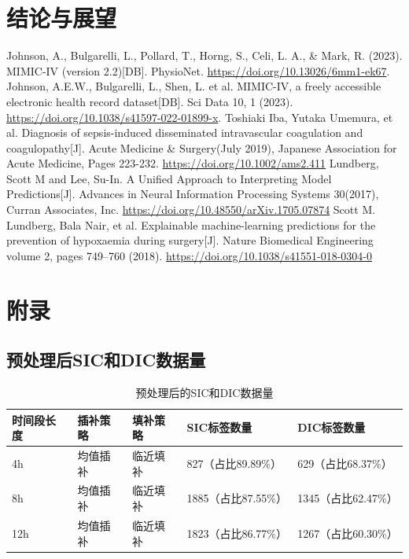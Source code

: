 \documentclass[12pt, a4paper, oneside]{ctexart}
\numberwithin{equation}{section}  %
\begin{document}
\section{结论与展望}
\clearpage
\begin{thebibliography}{99}
     Johnson, A., Bulgarelli, L., Pollard, T., Horng, S., Celi, L. A., \& Mark, R. (2023). 
    MIMIC-IV (version 2.2)[DB]. PhysioNet. \url{https://doi.org/10.13026/6mm1-ek67}.
     Johnson, A.E.W., Bulgarelli, L., Shen, L. et al. MIMIC-IV, 
    a freely accessible electronic health record dataset[DB]. Sci Data 10, 1 (2023). 
    \url{https://doi.org/10.1038/s41597-022-01899-x}.
     Toshiaki Iba, Yutaka Umemura, et al. 
    Diagnosis of sepsis-induced disseminated intravascular coagulation and coagulopathy[J]. 
    Acute Medicine \& Surgery(July 2019), Japanese Association for Acute Medicine, Pages 223-232.
    \url{https://doi.org/10.1002/ams2.411}
     Lundberg, Scott M and Lee, Su-In. A Unified Approach to Interpreting Model Predictions[J].
    Advances in Neural Information Processing Systems 30(2017), Curran Associates, Inc.
    \url{https://doi.org/10.48550/arXiv.1705.07874}
     Scott M. Lundberg, Bala Nair, et al. 
    Explainable machine-learning predictions for the prevention of hypoxaemia during surgery[J].
    Nature Biomedical Engineering volume 2, pages 749–760 (2018).
    \url{https://doi.org/10.1038/s41551-018-0304-0}
\end{thebibliography}
\clearpage
\appendix
\section{附录}
\subsection{预处理后SIC和DIC数据量}
\renewcommand\arraystretch{1.2} %
\begin{table}[H] %
    \centering %
    \begin{tabular}{p{}<{\centering}p{}<{\centering}p{}
        p{}p{}} %
        \toprule
        \textbf{时间段长度}&\textbf{插补策略}&\textbf{填补策略}&\textbf{SIC标签数量}&\textbf{DIC标签数量}\\
        \midrule
        4h&均值插补&临近填补&827（占比89.89\%）&629（占比68.37\%）\\
        8h&均值插补&临近填补&1885（占比87.55\%）&1345（占比62.47\%）\\
        12h&均值插补&临近填补&1823（占比86.77\%）&1267（占比60.30\%）\\
        \bottomrule
    \end{tabular}
    \caption{预处理后的SIC和DIC数据量}
    \label{table-sic-dic}
\end{table}
\end{document}
